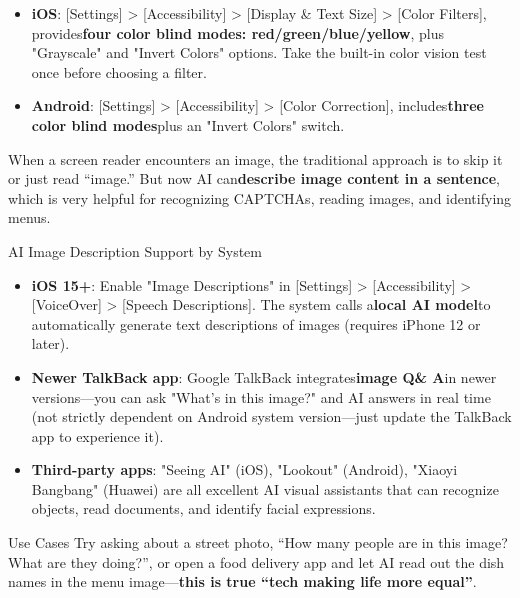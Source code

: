 
\begin{itemize}
  \item \textbf{iOS}: [Settings] > [Accessibility] > [Display \& Text Size] > [Color Filters], provides\textbf{four color blind modes: red/green/blue/yellow}, plus "Grayscale" and "Invert Colors" options. Take the built-in color vision test once before choosing a filter.
  \item \textbf{Android}: [Settings] > [Accessibility] > [Color Correction], includes\textbf{three color blind modes}plus an "Invert Colors" switch.
\end{itemize}


When a screen reader encounters an image, the traditional approach is to skip it or just read “image.” But now AI can\textbf{describe image content in a sentence}, which is very helpful for recognizing CAPTCHAs, reading images, and identifying menus.

\begin{tcbinfo}{AI Image Description Support by System}
\begin{itemize}
  \item \textbf{iOS 15+}: Enable "Image Descriptions" in [Settings] > [Accessibility] > [VoiceOver] > [Speech Descriptions]. The system calls a\textbf{local AI model}to automatically generate text descriptions of images (requires iPhone 12 or later).
  \item \textbf{Newer TalkBack app}: Google TalkBack integrates\textbf{image Q\& A}in newer versions—you can ask "What's in this image?" and AI answers in real time (not strictly dependent on Android system version—just update the TalkBack app to experience it).
  \item \textbf{Third-party apps}: "Seeing AI" (iOS), "Lookout" (Android), "Xiaoyi Bangbang" (Huawei) are all excellent AI visual assistants that can recognize objects, read documents, and identify facial expressions.
\end{itemize}

\end{tcbinfo}

\begin{tcbpractice}{Use Cases}
Try asking about a street photo, “How many people are in this image? What are they doing?”, or open a food delivery app and let AI read out the dish names in the menu image—\textbf{this is true “tech making life more equal”}.

\end{tcbpractice}

